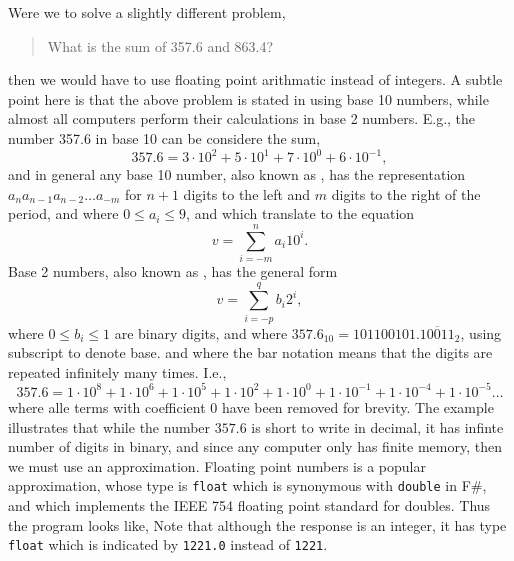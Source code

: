 Were we to solve a slightly different problem,
\begin{quote}
  What is the sum of 357.6 and 863.4?
\end{quote}
then we would have to use floating point arithmatic instead of integers. A subtle point here is that the above problem is stated in using base 10 numbers, while almost all computers perform their calculations in base 2 numbers. E.g., the number 357.6 in base 10 can be considere the sum,
\begin{equation}
  357.6 = 3\cdot 10^2 + 5\cdot 10^1 + 7\cdot 10^0 + 6\cdot 10^{-1},
\end{equation}
and in general any base 10 number, also known as , has the representation $a_n a_{n-1} a_{n-2} \dots a_{-m}$ for $n+1$ digits to the left and $m$ digits to the right of the period, and where $0 \leq a_i \leq 9$, and which translate to the equation
\begin{equation}
  v = \sum_{i=-m}^{n} a_i10^i.
\end{equation}
Base 2 numbers, also known as , has the general form
\begin{equation}
  v = \sum_{i=-p}^{q} b_i2^i,
\end{equation}
where $0 \leq b_i \leq 1$ are binary digits, and where $357.6_{10} = 101100101.\overline{10011}_2$, using subscript to denote base. and where the bar notation means that the digits are repeated infinitely many times. I.e.,
\begin{equation}
  357.6 = 1\cdot 10^8  + 1\cdot 10^6 + 1\cdot 10^5 + 1\cdot 10^2 + 1\cdot 10^0 + 1\cdot 10^{-1} + 1\cdot 10^{-4} + 1\cdot 10^{-5}\dots 
\end{equation}
where alle terms with coefficient 0 have been removed for brevity. The example illustrates that while the number $357.6$ is short to write in decimal, it has infinte number of digits in binary, and since any computer only has finite memory, then we must use an approximation. Floating point numbers is a popular approximation, whose type is \lstinline|float| which is synonymous with \lstinline|double| in F\#, and which implements the IEEE 754 floating point standard for doubles. Thus the program looks like,
Note that although the response is an integer, it has type \lstinline|float| which is indicated by \lstinline|1221.0| instead of \lstinline|1221|.

